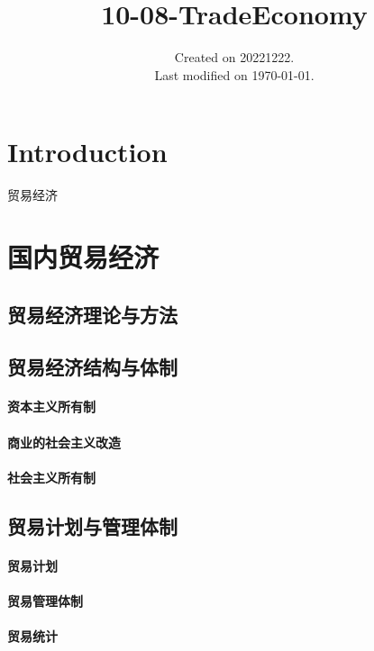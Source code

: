 \documentclass[UTF8]{../../RepresentationUniverse}
\begin{document}
\title{10-08-TradeEconomy}
\date{Created on 20221222.\\   Last modified on \today.}
\maketitle
\tableofcontents


\chapter{Introduction}



贸易经济
 




\chapter{国内贸易经济}
\section{贸易经济理论与方法}
\section{贸易经济结构与体制}
    \subsubsection{资本主义所有制}
    \subsubsection{商业的社会主义改造}
    \subsubsection{社会主义所有制}
\section{贸易计划与管理体制}
    \subsubsection{贸易计划}
    \subsubsection{贸易管理体制}
    \subsubsection{贸易统计}
\end{document}
